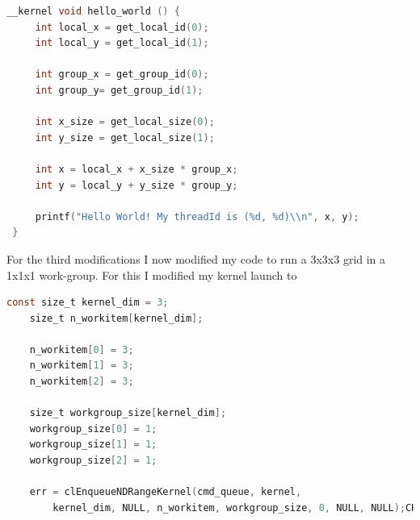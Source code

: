 \documentclass{article}
\begin{document}
\begin{mdframed}[backgroundcolor=codeColor,leftmargin=0.0cm,hidealllines=true,%
  innerleftmargin=0.1cm,innerrightmargin=0.1cm,innertopmargin=0.5cm,innerbottommargin=0.10cm,
  roundcorner=15pt]
\begin{lstlisting}[language=C]
 __kernel void hello_world () {                                                             
     int local_x = get_local_id(0);                            
     int local_y = get_local_id(1);                            
                                                               
     int group_x = get_group_id(0);                            
     int group_y= get_group_id(1);                             
                                                               
     int x_size = get_local_size(0);                           
     int y_size = get_local_size(1);                           
                                                               
     int x = local_x + x_size * group_x;                       
     int y = local_y + y_size * group_y;                       
                                                               
     printf("Hello World! My threadId is (%d, %d)\\n", x, y);
 }                                                             

\end{lstlisting}
\end{mdframed}

\newpage
For the third modifications I now modified my code to run a 3x3x3 grid in a 1x1x1 work-group. For this I modified my kernel launch to

\begin{mdframed}[backgroundcolor=codeColor,leftmargin=0.0cm,hidealllines=true,%
  innerleftmargin=0.1cm,innerrightmargin=0.1cm,innertopmargin=0.5cm,innerbottommargin=0.10cm,
  roundcorner=15pt]
\begin{lstlisting}[language=C]
    const size_t kernel_dim = 3;
    size_t n_workitem[kernel_dim];
  
    n_workitem[0] = 3;
    n_workitem[1] = 3;
    n_workitem[2] = 3;
  
    size_t workgroup_size[kernel_dim];
    workgroup_size[0] = 1;
    workgroup_size[1] = 1;
    workgroup_size[2] = 1;
  
    err = clEnqueueNDRangeKernel(cmd_queue, kernel, 
        kernel_dim, NULL, n_workitem, workgroup_size, 0, NULL, NULL);CHK_ERROR(err);
\end{lstlisting}
\end{mdframed}
\end{document}
